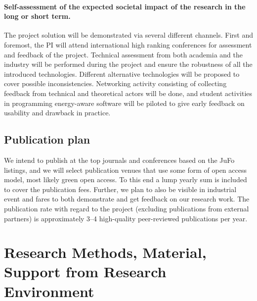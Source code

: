\documentclass{article}
\begin{document}
\paragraph{Self-assessment of the expected societal impact of the research in the long or short term.}
The project solution will be demonstrated via several different channels.
First and foremost, the PI will attend international high ranking conferences for assessment and feedback of the project.
Technical assessment from both academia and the industry will be performed during the project and ensure the robustness of all the introduced technologies.
Different alternative technologies will be proposed to cover possible inconsistencies.
Networking activity consisting of collecting feedback from technical and theoretical actors will be done,
and student activities in programming energy-aware software will be piloted to give early feedback on usability and drawback in practice.


\subsection{Publication plan}
We intend to publish at the top journals and conferences based on the JuFo listings, and we will select publication venues that use some form of open access model, most likely green open access. 
To this end a lump yearly sum is included to cover the publication fees. 
Further, we plan to also be visible in industrial event and fares to both demonstrate and get feedback on our research work.
The publication rate with regard to the project (excluding publications from external partners) is approximately 3--4 high-quality peer-reviewed publications per year.\smallskip

\section{Research Methods, Material, Support from Research Environment}
\end{document}
